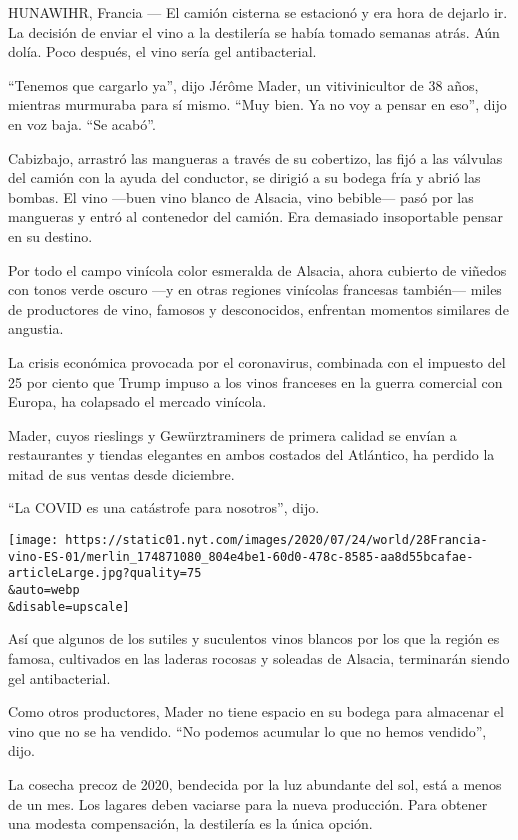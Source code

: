 HUNAWIHR, Francia --- El camión cisterna se estacionó y era hora de
dejarlo ir. La decisión de enviar el vino a la destilería se había
tomado semanas atrás. Aún dolía. Poco después, el vino sería gel
antibacterial.

``Tenemos que cargarlo ya'', dijo Jérôme Mader, un vitivinicultor de 38
años, mientras murmuraba para sí mismo. ``Muy bien. Ya no voy a pensar
en eso'', dijo en voz baja. ``Se acabó''.

Cabizbajo, arrastró las mangueras a través de su cobertizo, las fijó a
las válvulas del camión con la ayuda del conductor, se dirigió a su
bodega fría y abrió las bombas. El vino ---buen vino blanco de Alsacia,
vino bebible--- pasó por las mangueras y entró al contenedor del camión.
Era demasiado insoportable pensar en su destino.

Por todo el campo vinícola color esmeralda de Alsacia, ahora cubierto de
viñedos con tonos verde oscuro ---y en otras regiones vinícolas
francesas también--- miles de productores de vino, famosos y
desconocidos, enfrentan momentos similares de angustia.

La crisis económica provocada por el coronavirus, combinada con el
impuesto del 25 por ciento que Trump impuso a los vinos franceses en la
guerra comercial con Europa, ha colapsado el mercado vinícola.

Mader, cuyos rieslings y Gewürztraminers de primera calidad se envían a
restaurantes y tiendas elegantes en ambos costados del Atlántico, ha
perdido la mitad de sus ventas desde diciembre.

``La COVID es una catástrofe para nosotros'', dijo.

\texttt{[image: https://static01.nyt.com/images/2020/07/24/world/28Francia-vino-ES-01/merlin\_174871080\_804e4be1-60d0-478c-8585-aa8d55bcafae-articleLarge.jpg?quality=75\\\&auto=webp\\\&disable=upscale]}

Así que algunos de los sutiles y suculentos vinos blancos por los que la
región es famosa, cultivados en las laderas rocosas y soleadas de
Alsacia, terminarán siendo gel antibacterial.

Como otros productores, Mader no tiene espacio en su bodega para
almacenar el vino que no se ha vendido. ``No podemos acumular lo que no
hemos vendido'', dijo.

La cosecha precoz de 2020, bendecida por la luz abundante del sol, está
a menos de un mes. Los lagares deben vaciarse para la nueva producción.
Para obtener una modesta compensación, la destilería es la única opción.

